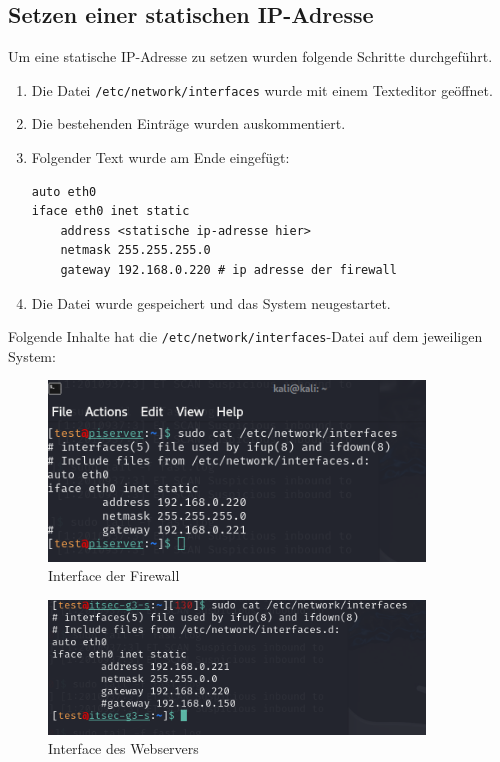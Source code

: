 \documentclass[
    a4paper,
    pagesize,
	pdftex,
    12pt,
]{scrartcl}
\begin{document}
\subsection{Setzen einer statischen IP-Adresse}\label{static-ip}
Um eine statische IP-Adresse zu setzen wurden folgende Schritte durchgeführt.
\begin{enumerate}
	\item Die Datei \lstinline[breaklines]|/etc/network/interfaces| wurde mit einem Texteditor geöffnet.
	\item Die bestehenden Einträge wurden auskommentiert.
	\item Folgender Text wurde am Ende eingefügt:
	\begin{lstlisting}[breaklines]
auto eth0
iface eth0 inet static
	address <statische ip-adresse hier>
	netmask 255.255.255.0
	gateway 192.168.0.220 # ip adresse der firewall
	\end{lstlisting}
	\item Die Datei wurde gespeichert und das System neugestartet.
\end{enumerate}
Folgende Inhalte hat die \lstinline[breaklines]|/etc/network/interfaces|-Datei auf dem jeweiligen System: \newpage
\begin{figure}[!ht]
	\centering
	\includegraphics[width=10cm]{interface-firewall.png}
	\caption{Interface der Firewall}
	\label{fig:interface-firewall}
\end{figure}
\begin{figure}[!ht]
	\centering
	\includegraphics[width=10cm]{interface-webserver.png}
	\caption{Interface des Webservers}
	\label{fig:interface-webserver}
\end{figure}

\newpage


\end{document}
